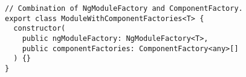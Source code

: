 \begin{verbatim}
// Combination of NgModuleFactory and ComponentFactory.
export class ModuleWithComponentFactories<T> {
  constructor(
    public ngModuleFactory: NgModuleFactory<T>,
    public componentFactories: ComponentFactory<any>[]
  ) {}
}
\end{verbatim}
